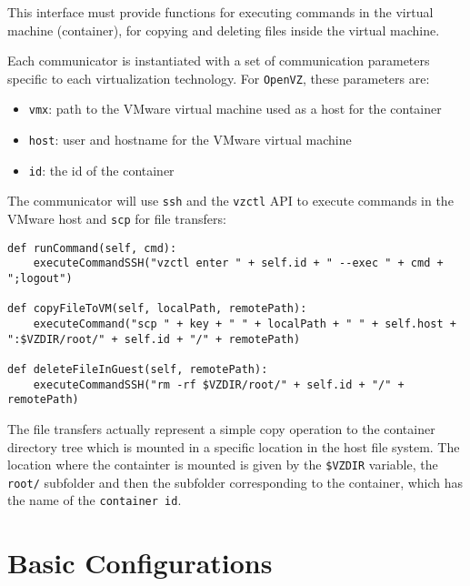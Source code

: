 
This interface must provide functions for executing commands in the virtual machine 
(container), for copying and deleting files inside the virtual machine.


Each communicator is instantiated with a set of communication parameters specific to each 
virtualization technology. For \texttt{OpenVZ}, these parameters are:
\begin{itemize}
  \item \texttt{vmx}: path to the VMware virtual machine used as a host for the container
  \item \texttt{host}: user and hostname for the VMware virtual machine
  \item \texttt{id}: the id of the container
\end{itemize}
The communicator will use \texttt{ssh} and the \texttt{vzctl} API to execute commands 
in the VMware host and \texttt{scp} for file transfers:
\\
\lstset{language=Python,caption=Communication with the container,
label=lst:container-comm}
\begin{lstlisting}
def runCommand(self, cmd):
	executeCommandSSH("vzctl enter " + self.id + " --exec " + cmd + ";logout")
	
def copyFileToVM(self, localPath, remotePath):
	executeCommand("scp " + key + " " + localPath + " " + self.host + ":$VZDIR/root/" + self.id + "/" + remotePath)
	
def deleteFileInGuest(self, remotePath):
	executeCommandSSH("rm -rf $VZDIR/root/" + self.id + "/" + remotePath)
\end{lstlisting}

The file transfers actually represent a simple copy operation to the container directory tree 
which is mounted in a specific location in the host file system. The location where the containter 
is mounted is given by the \texttt{\$VZDIR} variable, the \texttt{root/} subfolder and then the subfolder corresponding to the container, which has the name of the \texttt{container id}.

\section{Basic Configurations} \label{sec:openvz-basic-conf}

